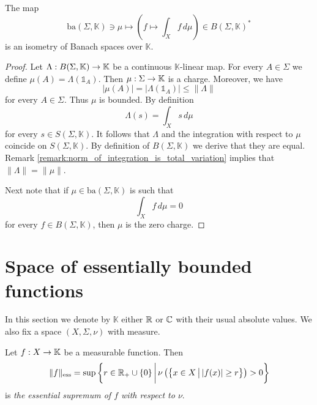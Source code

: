 \begin{theorem}\label{theorem:fichtenholz_kantorovich_for_bounded_functions}
    The map
    $$\mathrm{ba}(\Sigma,\mathbb{K})\ni \mu \mapsto \left(f\mapsto \int_Xf\,d\mu\right) \in B(\Sigma,\mathbb{K})^*$$
    is an isometry of Banach spaces over $\mathbb{K}$.
\end{theorem}
\begin{proof}
    Let $\Lambda:B(\Sigma,\mathbb{K})\rightarrow \mathbb{K}$ be a continuous $\mathbb{K}$-linear map. For every $A \in \Sigma$ we define $\mu(A) = \Lambda(\mathbb{1}_A)$. Then $\mu:\Sigma \rightarrow \mathbb{K}$ is a charge. Moreover, we have
    $$|\mu(A)| = \big|\Lambda(\mathbb{1}_A)\big| \leq \lVert \Lambda \rVert$$
    for every $A \in \Sigma$. Thus $\mu$ is bounded. By definition
    $$\Lambda(s) = \int_Xs\,d\mu$$
    for every $s \in S(\Sigma,\mathbb{K})$. It follows that $\Lambda$ and the integration with respect to $\mu$ coincide on $S(\Sigma,\mathbb{K})$. By definition of $B(\Sigma,\mathbb{K})$ we derive that they are equal. Remark \ref{remark:norm_of_integration_is_total_variation} implies that $\lVert \Lambda \rVert = \lVert \mu \rVert$.

    Next note that if $\mu \in \mathrm{ba}(\Sigma,\mathbb{K})$ is such that
    $$\int_Xf\,d\mu = 0$$
    for every $f \in B(\Sigma,\mathbb{K})$, then $\mu$ is the zero charge.
\end{proof}

\section{Space of essentially bounded functions}
\noindent
In this section we denote by $\mathbb{K}$ either ${\mathbb R}$ or ${\mathbb C}$ with their usual absolute values. We also fix a space $(X,\Sigma,\nu)$ with measure.

\begin{definition}
    Let $f:X\rightarrow \mathbb{K}$ be a measurable function. Then
    $$\lVert f \rVert_{\mathrm{ess}} = \sup \bigg\{r\in {\mathbb R}_+\cup \{0\}\,\bigg|\,\nu\left(\big\{x\in X\,\big|\,|f(x)| \geq r\big\}\right) > 0\bigg\}$$
    is \textit{the essential supremum of $f$ with respect to $\nu$}.
\end{definition}

